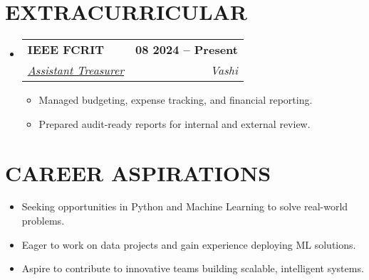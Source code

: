 \documentclass[letterpaper,11pt]{article}
\makeatletter
\newcommand{\resumeItem}[1]{
  \item\small{{#1 \vspace{-2pt}}}
}
\newcommand{\resumeSubheading}[4]{
  \vspace{-2pt}\item
    \begin{tabular*}{\linewidth}[t]{@{\extracolsep{\fill}}p{0.7\textwidth}r}
      \textbf{\large#1} & \textbf{\small #2} \\
      \textit{\large#3} & \textit{\small #4} \\
    \end{tabular*}\vspace{-7pt}
}
\newcommand{\resumeItemListStart}{\begin{itemize}}
\newcommand{\resumeItemListEnd}{\end{itemize}\vspace{-5pt}}
\newcommand{\resumeSubHeadingListStart}{\begin{itemize}[leftmargin=0.0in, label={}]}
\newcommand{\resumeSubHeadingListEnd}{\end{itemize}}
\makeatother
\begin{document}
\section{EXTRACURRICULAR}
\resumeSubHeadingListStart
    \resumeSubheading
      {IEEE FCRIT}{08 2024 -- Present}
      {\underline{Assistant Treasurer}}{Vashi}
        \resumeItemListStart
            \resumeItem{Managed budgeting, expense tracking, and financial reporting.}
            \resumeItem{Prepared audit-ready reports for internal and external review.}
        \resumeItemListEnd
\resumeSubHeadingListEnd

\section{CAREER ASPIRATIONS}
\resumeItemListStart
    \resumeItem{Seeking opportunities in Python and Machine Learning to solve real-world problems.}
    \resumeItem{Eager to work on data projects and gain experience deploying ML solutions.}
    \resumeItem{Aspire to contribute to innovative teams building scalable, intelligent systems.}
\resumeItemListEnd
\end{document}
